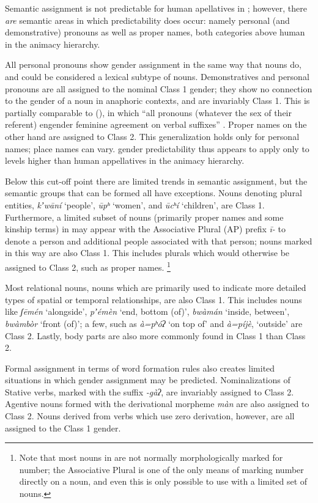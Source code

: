 \documentclass[output=collectionpaper,hidelinks]{langscibook}
\theoremstyle{remark}
\begin{document}
Semantic assignment is not predictable for human apellatives in ; however,
there \emph{are} semantic areas in which predictability does occur: namely
personal (and demonstrative) pronouns as well as proper names, both categories
above human in the animacy hierarchy.

All personal pronouns show gender assignment in the same way that nouns do, and
could be considered a lexical subtype of nouns.  Demonstratives and personal
pronouns are all assigned to the nominal Class 1 gender; they show no connection
to the gender of a noun in anaphoric contexts, and are invariably Class 1.  This
is partially comparable to  (), in which ``all pronouns (whatever
the sex of their referent) engender feminine agreement on verbal suffixes''
\citep[488]{Dixon2000}.  Proper names on the other hand are assigned
to Class 2.  This generalization holds only for personal names; place names can
vary.   gender predictability thus appears to apply only to levels higher
than human appellatives in the animacy hierarchy.

Below this cut-off point there are limited trends in semantic assignment, but
the semantic groups that can be formed all have exceptions.  Nouns denoting
plural entities, \emph{kʼwāní} `people', \emph{ūpʰ} `women', and
\emph{ūcʰí} `children', are Class 1.  Furthermore, a limited subset of nouns
(primarily proper names and some kinship terms) in  may appear with the
Associative Plural (AP) prefix \emph{ī-} to denote a person and additional
people associated with that person; nouns marked in this way are also Class 1.
This includes plurals which would otherwise be assigned to Class 2, such as
proper names.%
\footnote{Note that most nouns in  are not normally morphologically
marked for number; the Associative Plural is one of the only means of marking
number directly on a noun, and even this is only possible to use with a limited
set of nouns.}

Most relational nouns, nouns which are primarily used to indicate more detailed
types of spatial or temporal relationships, are also Class 1. This includes
nouns like \emph{ʃēmén} `alongside', \emph{pʼémèn} `end, bottom (of)',
\emph{bwàmán} `inside, between', \emph{bwàmbòr} `front (of)'; a few, such as
\emph{à=pʰóʔ} `on top of' and \emph{à=píjè}, `outside' are Class 2. Lastly,
body parts are also more commonly found in Class 1 than Class 2.

Formal assignment in terms of word formation rules also creates limited
situations in which gender assignment may be predicted. Nominalizations of
Stative verbs, marked with the suffix \emph{-gàʔ}, are invariably assigned to
Class 2. Agentive nouns formed with the derivational morpheme \emph{màn} are
also assigned to Class 2. Nouns derived from verbs which use zero derivation,
however, are all assigned to the Class 1 gender.
\end{document}
